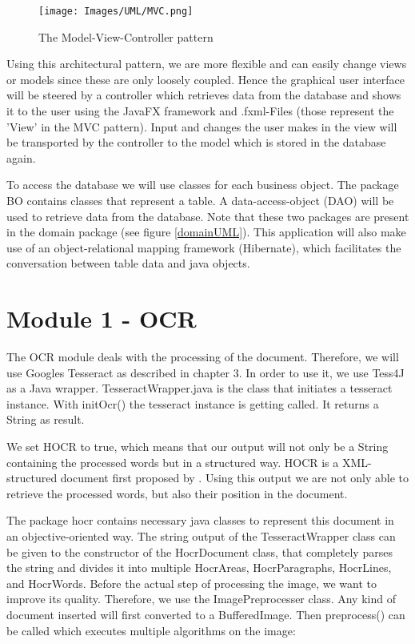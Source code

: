\begin{figure}[ht!]
\centering
\texttt{[image: Images/UML/MVC.png]}
\caption{The Model-View-Controller pattern \label{MVCpattern}}
\end{figure}

Using this architectural pattern, we are more flexible and can easily change views or models since these are only loosely coupled. Hence the graphical user interface will be steered by a controller which retrieves data from the database and shows it to the user using the JavaFX framework and .fxml-Files (those represent the 'View' in the MVC pattern). Input and changes the user makes in the view will be transported by the controller to the model which is stored in the database again.

To access the database we will use classes for each business object. The package BO contains classes that represent a table. A data-access-object (DAO) will be used to retrieve data from the database. Note that these two packages are present in the domain package (see figure \ref{domainUML}).
This application will also make use of an object-relational mapping framework (Hibernate), which facilitates the conversation between table data and java objects.

\section{Module 1 - OCR}
\label{sec5.4}

The OCR module deals with the processing of the document. Therefore, we will use Googles Tesseract as described in chapter 3. In order to use it, we use Tess4J as a Java wrapper. TesseractWrapper.java is the class that initiates a tesseract instance. With initOcr() the tesseract instance is getting called. It returns a String as result. 

We set HOCR to true, which means that our output will not only be a String containing the processed words but in a structured way. HOCR is a XML-structured document first proposed by \cite{Breuel07}. Using this output we are not only able to retrieve the processed words, but also their position in the document.

The package hocr contains necessary java classes to represent this document in an objective-oriented way. The string output of the TesseractWrapper class can be given to the constructor of the HocrDocument class, that completely parses the string and divides it into multiple HocrAreas, HocrParagraphs, HocrLines, and HocrWords.
Before the actual step of processing the image, we want to improve its quality. Therefore, we use the ImagePreprocesser class. Any kind of document inserted will first converted to a BufferedImage. Then preprocess() can be called which executes multiple algorithms on the image:


